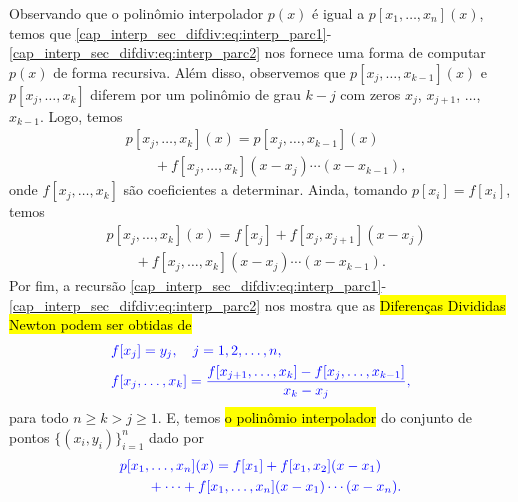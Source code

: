 Observando que o polinômio interpolador $p(x)$ é igual a $p[x_1,\dotsc,x_n](x)$, temos que \eqref{cap_interp_sec_difdiv:eq:interp_parc1}-\eqref{cap_interp_sec_difdiv:eq:interp_parc2} nos fornece uma forma de computar $p(x)$ de forma recursiva. Além disso, observemos que $p[x_j, \dotsc, x_{k-1}](x)$ e $p[x_j, \dotsc, x_k]$ diferem por um polinômio de grau $k-j$ com zeros $x_j$, $x_{j+1}$, ..., $x_{k-1}$. Logo, temos
\begin{equation}
  \begin{aligned}
    &p[x_j,\dotsc,x_k](x) = p[x_j,\dotsc,x_{k-1}](x) \\
    &\qquad + f[x_j,\dotsc,x_k](x-x_j)\cdots(x-x_{k-1}),
  \end{aligned}
\end{equation}
onde $f[x_j, \dotsc, x_k]$ são coeficientes a determinar. Ainda, tomando $p[x_i] = f[x_i]$, temos
\begin{equation}
  \begin{aligned}
    &p[x_j,\dotsc,x_k](x) = f[x_j] + f[x_j,x_{j+1}](x-x_j)\\
    &\qquad + f[x_j,\dotsc,x_k](x-x_j)\cdots(x-x_{k-1}).
  \end{aligned}
\end{equation}
Por fim, a recursão \eqref{cap_interp_sec_difdiv:eq:interp_parc1}-\eqref{cap_interp_sec_difdiv:eq:interp_parc2} nos mostra que as \hl{Diferenças Divididas Newton podem ser obtidas de}
\begin{subequations}\label{cap_interp_sec_difdiv:eq:interp_difdiv}\hleq
  \begin{align}
    &f[x_j] = y_j,\quad j=1,2,\dotsc,n,\\
    &f[x_j,\dotsc,x_k] = \frac{f[x_{j+1},\dotsc,x_k]-f[x_j,\dotsc,x_{k-1}]}{x_k-x_j},
  \end{align}
\end{subequations}
para todo $n\geq k > j \geq 1$. E, temos \hl{o polinômio interpolador} do conjunto de pontos $\{(x_i,y_i)\}_{i=1}^n$ dado por
\begin{equation}\label{cap_interp_sec_difdiv:eq:interpoli_Newton}\color{blue}\begin{aligned}
    &p[x_1,\dotsc,x_n](x) = f[x_1] + f[x_1,x_2](x-x_1) \\
    &\qquad + \cdots + f[x_1,\dotsc,x_n](x-x_1)\cdots(x-x_n).  
  \end{aligned}
\end{equation}

